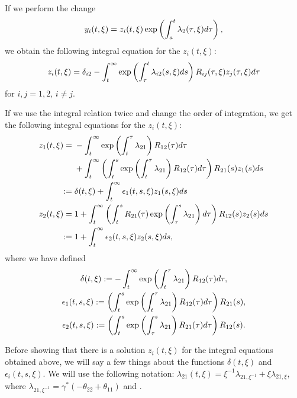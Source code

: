 \documentclass[11pt]{article}
\numberwithin{equation}{section}
\numberwithin{equation}{section}
\begin{document}
If we perform the change
\begin{equation*}
 y_i(t,\xi)=z_i(t,\xi)\exp \left(\int_{a}^{t}\lambda_2(\tau,\xi){\rm d}\tau \right),
\end{equation*}
we obtain the following integral equation for the $z_i(t,\xi)$:
\begin{gather}
 z_i(t,\xi)=\delta_{i2} - \int_{t}^{\infty}\exp \left(\int_{\tau}^{t}\lambda_{i2}(s,\xi){\rm d}s\right)R_{ij}(\tau,\xi)z_j(\tau,\xi){\rm d}\tau
\label{IE2}
\end{gather}
for $i,j=1,2$, $i\neq j$.

If we use the integral relation twice and change the order of integration, we get the following integral equations for the $z_i(t,\xi)$:
\begin{align}
 z_1(t,\xi)={}&-\int_{t}^{\infty}\exp \left(\int_{t}^{\tau}\lambda_{21}\right)R_{12}(\tau){\rm d}\tau\nonumber\\
 &+ \int_{t}^{\infty}\left(\int_{t}^{s}\exp \left(\int_{t}^{\tau}\lambda_{21}\right)R_{12}(\tau){\rm d}\tau \right) R_{21}(s)z_1(s){\rm d}s\nonumber\\
:={}& \delta(t,\xi) + \int_{t}^{\infty}\epsilon_1(t,s,\xi)z_1(s,\xi){\rm d}s\nonumber\\
 z_2(t,\xi)={}& 1 + \int_{t}^{\infty}\left(\int_{t}^{s}R_{21}(\tau)\exp \left(\int_{\tau}^{s}\lambda_{21} \right){\rm d}\tau \right)R_{12}(s)z_2(s){\rm d}s\nonumber\\
:={}& 1 + \int_{t}^{\infty}\epsilon_2(t,s,\xi)z_2(s,\xi){\rm d}s,\label{IE3}
\end{align}
where we have defined
\begin{gather*}
 \delta(t,\xi):= -\int_{t}^{\infty}\exp \left(\int_{t}^{\tau}\lambda_{21}\right)R_{12}(\tau){\rm d}\tau,\\
 \epsilon_1(t,s,\xi):= \left(\int_{t}^{s}\exp \left(\int_{t}^{\tau}\lambda_{21}\right)R_{12}(\tau){\rm d}\tau \right) R_{21}(s),\\
 \epsilon_2(t,s,\xi):= \left(\int_{t}^{s}\exp \left(\int_{\tau}^{s}\lambda_{21} \right)R_{21}(\tau){\rm d}\tau \right)R_{12}(s).
\end{gather*}

Before showing that there is a solution $z_i(t,\xi)$ for the integral equations obtained above, we will say a few things about the functions $\delta(t,\xi)$ and $\epsilon_i(t,s,\xi)$. We will use the following notation: $\lambda_{21}(t,\xi)=\xi^{-1}\lambda_{21,\xi^{-1}}+\xi\lambda_{21,\xi}$, where $\lambda_{21,\xi^{-1}}=\gamma^*(-\theta_{22}+\theta_{11})$ and .
\end{document}
